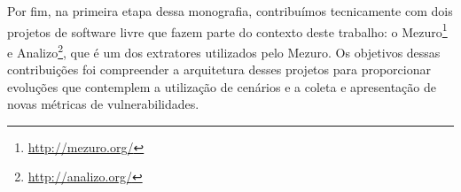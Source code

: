 Por fim, na primeira etapa dessa monografia, contribuímos tecnicamente com dois projetos de software livre que fazem parte do contexto deste trabalho: o Mezuro\footnote{\url{http://mezuro.org/}} e Analizo\footnote{\url{http://analizo.org/}}, que é um dos extratores utilizados pelo Mezuro. Os objetivos dessas contribuições foi compreender a arquitetura desses projetos para proporcionar evoluções que contemplem a utilização de cenários e a coleta e apresentação de novas métricas de vulnerabilidades.
